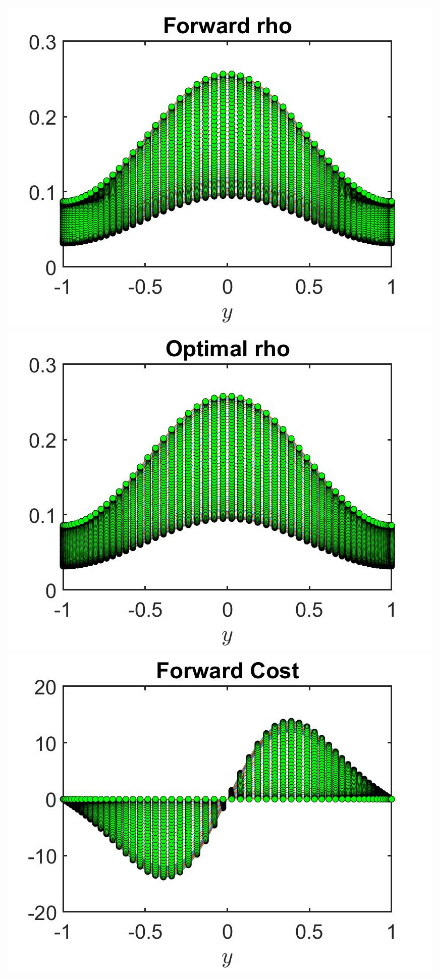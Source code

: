\documentclass[11pt, a4paper]{article}
\theoremstyle{definition}
\begin{document}
\begin{figure}[h]
	\includegraphics[scale=0.3]{wFrhoFW2.jpg}	\includegraphics[scale=0.3]{wFrhoOpt2.jpg}
	\includegraphics[scale=0.3]{wFwFW2.jpg}

\end{figure}
\end{document}
